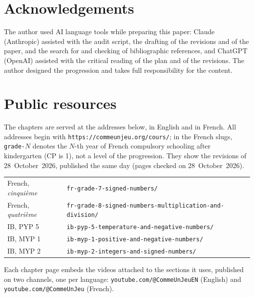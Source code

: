 \documentclass[11pt,a4paper]{article}
\theoremstyle{definition}
\begin{document}
\section*{Acknowledgements}
The author used AI language tools while preparing this paper: Claude (Anthropic) assisted with the audit script, the drafting of the revisions and of the paper, and the search for and checking of bibliographic references, and ChatGPT (OpenAI) assisted with the critical reading of the plan and of the revisions. The author designed the progression and takes full responsibility for the content.




\appendix
\section{Public resources}\label{app:resources}

The chapters are served at the addresses below, in English and in French. All addresses begin with \texttt{https://commeunjeu.org/cours/}; in the French slugs, \texttt{grade-}$N$ denotes the $N$-th year of French compulsory schooling after kindergarten (CP is 1), not a level of the progression. They show the revisions of 28~October~2026, published the same day (pages checked on 28~October~2026).
\begin{center}\small
\begin{tabular}{ll}
\toprule
French, \emph{cinqui\`eme} & \texttt{fr-grade-7-signed-numbers/} \\
French, \emph{quatri\`eme} & \texttt{fr-grade-8-signed-numbers-multiplication-and-division/} \\
IB, PYP 5 & \texttt{ib-pyp-5-temperature-and-negative-numbers/} \\
IB, MYP 1 & \texttt{ib-myp-1-positive-and-negative-numbers/} \\
IB, MYP 2 & \texttt{ib-myp-2-integers-and-signed-numbers/} \\
\bottomrule
\end{tabular}
\end{center}
Each chapter page embeds the videos attached to the sections it uses, published on two channels, one per language: \texttt{youtube.com/@CommeUnJeuEN} (English) and \texttt{youtube.com/@CommeUnJeu} (French).

\end{document}
